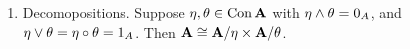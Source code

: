 {{\begin{enumerate}
    \begin{itemize}
    \item group $\bG$ -- $\Con \bG$ is isomorphic to the lattice of normal
      subgroups of $\bG$\\
      if $N = \{g\in G \mid \phi(g) = 1\} = 1/\ker \phi$. $(x,y)\in \ker \phi$ iff $x^{-1}y \in N$.
    \item ring $\bR$ -- $\Con \bR$ lattice of two-sided ideals of $\bR$.
    \item modules -- lattice of submodules
    \end{itemize}
  \item Decomopositions.  Suppose $\eta, \theta \in \mathrm{Con\,} \mathbf{A}$ with $\eta \wedge
    \theta = 0_A$, and $\eta \vee \theta = \eta \circ \theta = 1_A$.  Then $\mathbf{A}
    \cong \mathbf{A}/\eta \times \mathbf{A}/\theta$.
  \end{enumerate}
}
}

